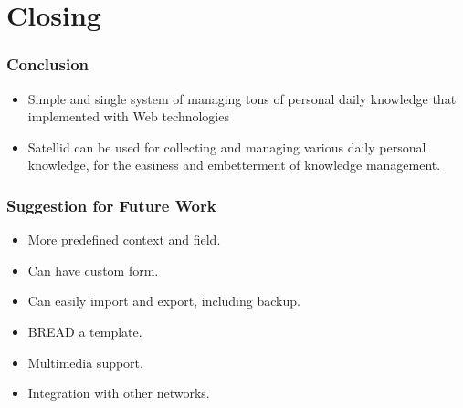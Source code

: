 \documentclass[10pt, compress]{beamer}
\begin{document}

\section{Closing}


\begin{frame}[fragile]
  \frametitle{Conclusion}

  \begin{itemize}
    \item Simple and \alert{single system} of managing tons of \alert{personal daily knowledge}
          that implemented with \alert{Web technologies}
    \item Satellid can be used for collecting and managing various daily personal knowledge,
          for the easiness and embetterment of knowledge management.
  \end{itemize}

\end{frame}


\begin{frame}[fragile]
  \frametitle{Suggestion for Future Work}

  \begin{itemize} \itemsep0pt
    \item More predefined context and field.
    \item Can have custom form.
    \item Can easily import and export, including backup.
    \item \textsc{BREAD} a template.
    \item Multimedia support.
    \item Integration with other networks.
  \end{itemize}

\end{frame}




\end{document}
